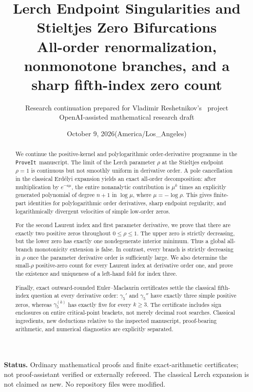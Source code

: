 \documentclass[11pt]{article}
\title{Lerch Endpoint Singularities and\\Stieltjes Zero Bifurcations\\[5pt]
\large All-order renormalization, nonmonotone branches, and a sharp fifth-index zero count}
\author{Research continuation prepared for Vladimir Reshetnikov's \repo\ project\\
\small OpenAI-assisted mathematical research draft}
\date{October 9, 2026\quad (America/Los\_Angeles)}
\numberwithin{equation}{section}
\theoremstyle{definition}\newtheorem{definition}[theorem]{Definition}
\theoremstyle{remark}\newtheorem{remark}[theorem]{Remark}
\newcommand{\repo}{\texttt{ProveIt}}
\begin{document}
\maketitle
\thispagestyle{empty}
\begin{abstract}
We continue the positive-kernel and polylogarithmic order-derivative programme in the \repo\ manuscript. The limit of the Lerch parameter $\rho$ at the Stieltjes endpoint $\rho=1$ is continuous but not smoothly uniform in derivative order. A pole cancellation in the classical Erd\'elyi expansion yields an exact all-order decomposition: after multiplication by $e^{-a\mu}$, the entire nonanalytic contribution is $\mu^k$ times an explicitly generated polynomial of degree $n+1$ in $\log\mu$, where $\mu=-\log\rho$. This gives finite-part identities for polylogarithmic order derivatives, sharp endpoint regularity, and logarithmically divergent velocities of simple low-order zeros.

For the second Laurent index and first parameter derivative, we prove that there are exactly two positive zeros throughout $0\leq\rho\leq1$. The upper zero is strictly decreasing, but the lower zero has exactly one nondegenerate interior minimum. Thus a global all-branch monotonicity extension is false. In contrast, every branch is strictly decreasing in $\rho$ once the parameter derivative order is sufficiently large. We also determine the small-$\rho$ positive-zero count for every Laurent index at derivative order one, and prove the existence and uniqueness of a left-hand fold for index three.

Finally, exact outward-rounded Euler--Maclaurin certificates settle the classical fifth-index question at every derivative order: $\gamma_5'$ and $\gamma_5''$ have exactly three simple positive zeros, whereas $\gamma_5^{(k)}$ has exactly five for every $k\geq3$. The certificate includes sign enclosures on entire critical-point brackets, not merely decimal root searches. Classical ingredients, new deductions relative to the inspected manuscript, proof-bearing arithmetic, and numerical diagnostics are explicitly separated.
\end{abstract}
\vspace{4pt}
\noindent\textbf{Status.} Ordinary mathematical proofs and finite exact-arithmetic certificates; not proof-assistant verified or externally refereed. The classical Lerch expansion is not claimed as new. No repository files were modified.
\newpage
\tableofcontents
\newpage
\end{document}
